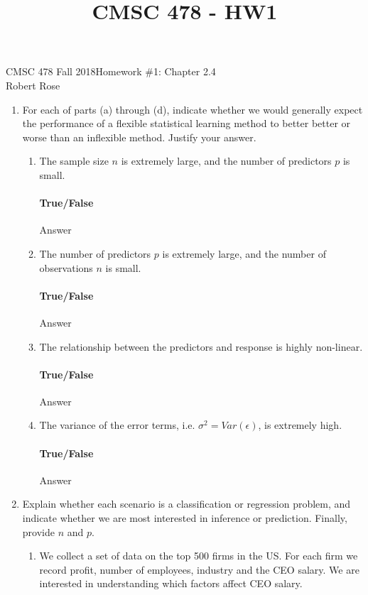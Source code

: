 \documentclass[12pt]{article}
\title{CMSC 478 - HW1}
\begin{document}
CMSC 478 Fall 2018\hfill Homework \#1: Chapter 2.4\\
Robert Rose

\hrulefill

\begin{enumerate}
\item For each of parts (a) through (d), indicate whether we would generally
      expect the performance of a flexible statistical learning method to better
      better or worse than an inflexible method. Justify your answer.
  \begin{enumerate}
  \item The sample size $n$ is extremely large, and the number of predictors
        $p$ is small.\\
  \vspace{-2.5em}
  \paragraph{True/False} Answer

  \item The number of predictors $p$ is extremely large, and the number of
        observations $n$ is small.\\
  \vspace{-2.5em}
  \paragraph{True/False} Answer

  \item The relationship between the predictors and response is highly non-linear.\\
  \vspace{-2.5em}
  \paragraph{True/False} Answer

  \item The variance of the error terms, i.e. $\sigma^2 = Var(\epsilon)$, is extremely high.\\
  \vspace{-2.5em}
  \paragraph{True/False} Answer
  \end{enumerate}
\newpage

\item Explain whether each scenario is a classification or regression problem,
      and indicate whether we are most interested in inference or prediction.
      Finally, provide $n$ and $p$.
  \begin{enumerate}
  \item We collect a set of data on the top 500 firms in the US. For each firm
        we record profit, number of employees, industry and the CEO salary. We
        are interested in understanding which factors affect CEO salary.\\
  \vspace{-2.5em}

\end{enumerate}
\end{enumerate}
\end{document}

